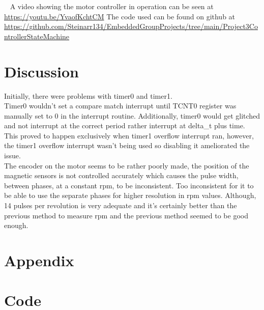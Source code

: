 \documentclass{article}
\begin{document}
\ 
\newpage
A video showing the motor controller in operation can be seen at \url{https://youtu.be/YvaofKchtCM}
The code used can be found on github at \url{https://github.com/Steinarr134/EmbeddedGroupProjects/tree/main/Project3ControllerStateMachine} 
\section{Discussion}

Initially, there were problems with timer0 and timer1. 
\\
Timer0 wouldn't set a compare match interrupt until TCNT0 register was manually set to 0 in the interrupt routine. Additionally, timer0 would get glitched and not interrupt at the correct period rather interrupt at delta\_t plus time. This proved to happen exclusively when timer1 overflow interrupt ran, however, the timer1 overflow interrupt wasn't being used so disabling it ameliorated the issue.
\\
The encoder on the motor seems to be rather poorly made, the position of the magnetic sensors is not controlled accurately which causes the pulse width, between phases, at a constant rpm, to be inconsistent. Too inconsistent for it to be able to use the separate phases for higher resolution in rpm values. Although, 14 pulses per revolution is very adequate and it's certainly better than the previous method to measure rpm and the previous method seemed to be good enough. 
\section*{Appendix}
\appendix

\newpage
\section{Code}\label{appendix:code}






\end{document}
